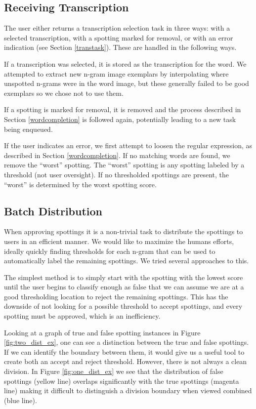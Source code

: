 \documentclass[ms,electronic,twosidetoc,letterpaper,chaptercenter,parttop,lof,lot]{byumsphd}
\begin{document}
\subsection{Receiving Transcription}
The user either returns a transcription selection task in three ways: with a selected transcription, with a spotting marked for removal, or with an error indication (see Section \ref{transtask}). These are handled in the following ways.

If a transcription was selected, it is stored as the transcription for the word. We attempted to extract new n-gram image exemplars by interpolating where unspotted n-grams were in the word image, but these generally failed to be good exemplars so we chose not to use them.

If a spotting is marked for removal, it is removed and the process described in Section \ref{wordcompletion} is followed again, potentially leading to a new task being enqueued.

If the user indicates an error, we first attempt to loosen the regular expression, as described in Section \ref{wordcompletion}. If no matching words are found, we remove the ``worst'' spotting. The ``worst'' spotting is any spotting labeled by a threshold (not user oversight). If no thresholded spottings are present, the ``worst'' is determined by the worst spotting score.


\subsection{Batch Distribution}
When approving spottings it is a non-trivial task to distribute the spottings to users in an efficient manner. We would like to maximize the humans efforts, ideally quickly finding thresholds for each n-gram that can be used to automatically label the remaining spottings. We tried several approaches to this.

The simplest method is to simply start with the spotting with the lowest score until the user begins to classify enough as false that  we can assume we are at a good thresholding location to reject the remaining spottings. 
This has the downside of not looking for a possible threshold to accept spottings, and every spotting must be approved, which is an inefficiency.


Looking at a graph of true and false spotting instances in Figure \ref{fig:two_dist_ex}, one can see a distinction between the true and false spottings. If we can identify the boundary between them, it would give us a useful tool to create both an accept and reject threshold. However, there is not always a clean division. In Figure \ref{fig:one_dist_ex} we see that the distribution of false spottings (yellow line) overlaps significantly with the true spottings (magenta line) making it difficult to distinguish a division boundary when viewed combined (blue line).
\end{document}

